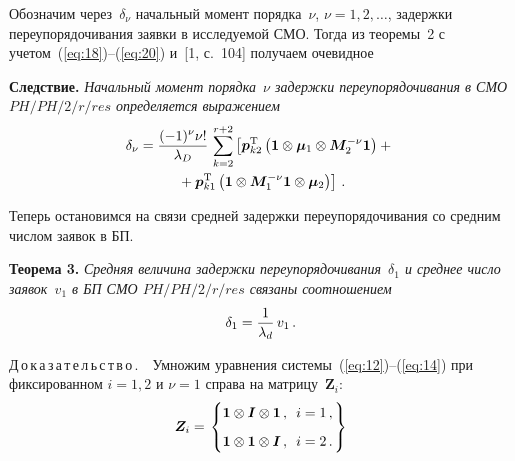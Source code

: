 \begin{multicols}{2}
\smallskip

Обозначим через~$\delta_{\nu}$ начальный момент порядка~$\nu$, $\nu=1,2,\ldots$, 
задержки переупорядочивания заявки в исследуемой СМО. Тогда из теоремы~2 с 
учетом~(\ref{eq:18})--(\ref{eq:20}) и~[1, с.~104] получаем очевидное

\medskip

\noindent
\textbf{Следствие.} {\it{Начальный момент порядка~$\nu$ задержки переупорядочивания в 
СМО $PH/PH/2/r/res$ определяется выражением}}
\begin{multline}
\label{eq:21}
\delta_{\nu}=\displaystyle\frac{\displaystyle (-1)^{\nu}\nu!\mathstrut}{\displaystyle \lambda_D\mathstrut}\,
\sum\limits_{k=2}^{r+2}\left[\boldsymbol{p}_{k2}^{\mathrm{T}}
\left(\boldsymbol{1}\otimes\boldsymbol{\mu}_1\otimes\boldsymbol{M}_2^{-\nu} \boldsymbol{1}\right)+{}\right.\\
\left.{}+\boldsymbol{p}_{k1}^{\mathrm{T}}
\left(\boldsymbol{1}\otimes\boldsymbol{M}_1^{-\nu} \boldsymbol{1}\otimes\boldsymbol{\mu}_2\right)\right]\,.
\end{multline}



Теперь остановимся на связи средней задержки переупорядочивания со средним числом заявок в БП.

\bigskip

\noindent
{\bf{Теорема 3.}} {\it{Средняя величина задержки переупорядочивания~$\delta_1$ и среднее число заявок~$v_1$ 
в БП СМО $PH/PH/2/r/res$ связаны соотношением
\begin{equation}
\label{eq:22}
\delta_1=\displaystyle\frac{\displaystyle 1\mathstrut}{\displaystyle \lambda_d\mathstrut}\,v_1\,.
\end{equation}
}}

\medskip

\noindent
Д\,о\,к\,а\,з\,а\,т\,е\,л\,ь\,с\,т\,в\,о\,.\ \ Умножим уравнения системы~(\ref{eq:12})--(\ref{eq:14}) 
при фиксированном $i=1,2$ и $\nu=1$ справа на матрицу~$\boldsymbol{Z}_i$:
\begin{equation*}
\boldsymbol{Z}_i=
\left.
\begin{cases}
\boldsymbol{1}\otimes \boldsymbol{I}\otimes \boldsymbol{1}\,,\enskip i=1\,,\\[6pt]
 \boldsymbol{1}\otimes \boldsymbol{1}\otimes \boldsymbol{I}\,,\enskip i=2\,.
\end{cases}\!\!\!\!\!\!
\right \}
\end{equation*}


\end{multicols}
